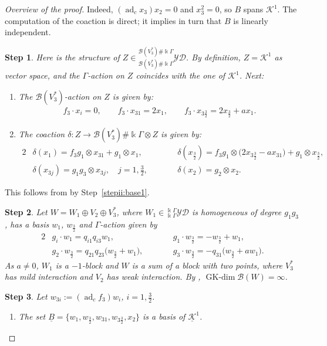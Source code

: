 \documentclass[pdftex]{sigma}
\numberwithin{equation}{section}
\newtheorem{stepii}{Step}
\newcommand{\adc}{\operatorname{ad}_c}
\newcommand{\GK}{\operatorname{GK-dim}}
\newcommand{\toba}{\mathscr B}
\newcommand{\K}{{\mathcal{K}}}
\newcommand{\Ku}{\underline{\mathcal K}}
\newcommand{\yd}[1]{{}_{#1}^{#1}\mathcal{YD}}
\newcommand{\tresdos}{\frac{3}{2}}
\begin{document}
\begin{proof}[Overview of the proof]
Indeed, $(\adc x_3)x_2=0$ and $x_3^2=0$, so $B$ spans $\K^1$.
The computation of the coaction is direct; it implies in turn that $B$ is linearly independent.

\begin{stepii}
Here is the structure of $Z\in \yd{\toba(V_3^*)\#\Bbbk \Gamma}$.
By definition, $Z=\K^1$ as vector space, and the $\Gamma$-action on $Z$ coincides with the one of $\K^1$.
Next:
\begin{enumerate}[label=$(\roman*)$]
\item The $\toba(V_3^*)$-action on $Z$ is given by:
\begin{align*}
f_3 \cdot x_i =0,\qquad f_3 \cdot x_{31} = 2x_1,\qquad f_3 \cdot x_{3\tresdos} = 2x_{\tresdos}+ax_1.
\end{align*}
\item The coaction $\delta\colon Z\to \toba(V_3^*)\#\Bbbk\Gamma\otimes Z$ is given by:
\begin{alignat*}{2}
&\delta(x_1) = f_3g_1 \otimes x_{31}+g_1\otimes x_1,&&
\delta(x_{\tresdos}) = f_3g_1 \otimes \big(2x_{3\tresdos}-ax_{31}\big)+g_1\otimes x_{\tresdos},
\\
&\delta(x_{3j})=g_1g_3\otimes x_{3j}, \quad j=1,\tfrac{3}{2},\qquad
&&\delta(x_2) = g_2\otimes x_2.
\end{alignat*}
\end{enumerate}
\end{stepii}
This follows from \cite[Theorem 12.3.2 and Remark 12.3.8]{HS-book} by Step~\ref{stepii:base1}.

\begin{stepii} \label{stepii:def-W}
Let $W=W_1\oplus V_2\oplus V_3^*$,
where $W_1\in\yd{\Bbbk\Gamma}$ is homogeneous of degree $g_1g_3$, has a basis $w_1$, $w_{\tresdos}$ and $\Gamma$-action given by
\begin{alignat*}{2}
&g_i\cdot w_1=q_{i1}q_{i3}w_1, &&
g_1 \cdot w_{\tresdos}=-w_{\tresdos}+w_1,
\\
&g_2 \cdot w_{\tresdos}=q_{21}q_{23}\big(w_{\tresdos}+w_1\big), \qquad&&
g_3 \cdot w_{\tresdos}=-q_{31}\big(w_{\tresdos}+aw_1\big).
\end{alignat*}
As $a\ne 0$, $W_1$ is a $-1$-block and $W$ is a sum of a block with two points, where $V_3^*$ has mild interaction and $V_2$ has weak interaction.
By {\rm \cite[Lemma~5.4.11]{AAH-triang}}, $\GK\toba(W)=\infty$.
\end{stepii}

\begin{stepii}\label{stepii:base2} Let $w_{3i}:=(\adc f_3)w_i$, $i=1,\tresdos$.
\begin{enumerate}[label=$(\roman*)$]
\item The set $\underline{B}=\big\{w_1,w_{\tresdos},w_{31},w_{3\tresdos},x_2\big\}$ is a basis of $\Ku^1$.


\end{enumerate}
\end{stepii}
\end{proof}
\end{document}
